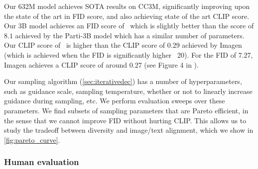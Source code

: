 Our 632M model achieves SOTA results on CC3M, significantly improving upon the state of the art in FID score, and also achieving state of the art CLIP score. Our 3B model achieves an FID score of \cocofid~which is slightly better than the score of $8.1$ achieved by the Parti-3B model which has a similar number of parameters. Our CLIP score of \cococlip~is higher than the CLIP score of 0.29 achieved by Imagen (which is achieved when the FID is significantly higher ~20). For the FID of 7.27, Imagen achieves a CLIP score of around 0.27 (see Figure 4 in \citep{imagen}).

Our sampling algorithm (\cref{sec:iterativedec}) has a number of hyperparameters, such as guidance scale, sampling temperature, whether or not to linearly increase guidance during sampling, etc. We perform evaluation sweeps over these parameters. We find subsets of sampling parameters that are Pareto efficient, in the sense that we cannot improve FID without hurting CLIP. This allows us to study the tradeoff between diversity and image/text alignment, which we show in \cref{fig:pareto_curve}.

\subsubsection{Human evaluation}

